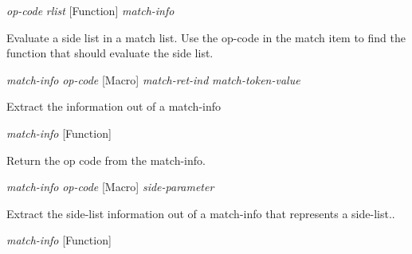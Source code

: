 \vspace{1em}
\noindent
{}
\usebox{\funcname}\emph{op-code} \emph{rlist}
 \hfill [Function]
\hspace*{\wd\funcname}\emph{match-info}

\begin{doc-string}
Evaluate a side list in a match list.  Use the op-code in  the match item to
find the function that should evaluate the side list.
\end{doc-string}

\vspace{1em}
\noindent
{}
\usebox{\funcname}\emph{match-info} \emph{op-code}
 \hfill [Macro]
\hspace*{\wd\funcname}\emph{match-ret-ind}
\hspace*{\wd\funcname}\emph{match-token-value}

\begin{doc-string}
Extract the information out of a match-info
\end{doc-string}

\vspace{1em}
\noindent
{}
\usebox{\funcname}\emph{match-info}
 \hfill [Function]

\begin{doc-string}
Return the op code from the match-info.
\end{doc-string}

\vspace{1em}
\noindent
{}
\usebox{\funcname}\emph{match-info} \emph{op-code}
 \hfill [Macro]
\hspace*{\wd\funcname}\emph{side-parameter}

\begin{doc-string}
Extract the side-list information out of a match-info that represents a side-list..
\end{doc-string}

\vspace{1em}
\noindent
{}
\usebox{\funcname}\emph{match-info}
 \hfill [Function]

